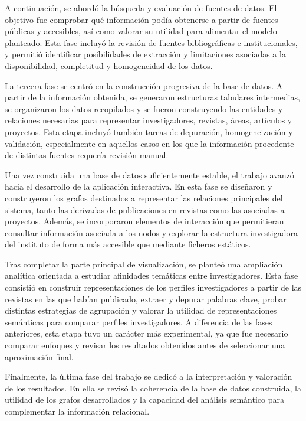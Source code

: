 \documentclass[11pt,spanish,listoffigures,listoftables]{tfgetsinf}
\begin{document}
A continuación, se abordó la búsqueda y evaluación de fuentes de datos. El objetivo fue comprobar qué información podía obtenerse a partir de fuentes públicas y accesibles, así como valorar su utilidad para alimentar el modelo planteado. Esta fase incluyó la revisión de fuentes bibliográficas e institucionales, y permitió identificar posibilidades de extracción y limitaciones asociadas a la disponibilidad, completitud y homogeneidad de los datos.

La tercera fase se centró en la construcción progresiva de la base de datos. A partir de la información obtenida, se generaron estructuras tabulares intermedias, se organizaron los datos recopilados y se fueron construyendo las entidades y relaciones necesarias para representar investigadores, revistas, áreas, artículos y proyectos. Esta etapa incluyó también tareas de depuración, homogeneización y validación, especialmente en aquellos casos en los que la información procedente de distintas fuentes requería revisión manual.

Una vez construida una base de datos suficientemente estable, el trabajo avanzó hacia el desarrollo de la aplicación interactiva. En esta fase se diseñaron y construyeron los grafos destinados a representar las relaciones principales del sistema, tanto las derivadas de publicaciones en revistas como las asociadas a proyectos. Además, se incorporaron elementos de interacción que permitieran consultar información asociada a los nodos y explorar la estructura investigadora del instituto de forma más accesible que mediante ficheros estáticos.

Tras completar la parte principal de visualización, se planteó una ampliación analítica orientada a estudiar afinidades temáticas entre investigadores. Esta fase consistió en construir representaciones de los perfiles investigadores a partir de las revistas en las que habían publicado, extraer y depurar palabras clave, probar distintas estrategias de agrupación y valorar la utilidad de representaciones semánticas para comparar perfiles investigadores. A diferencia de las fases anteriores, esta etapa tuvo un carácter más experimental, ya que fue necesario comparar enfoques y revisar los resultados obtenidos antes de seleccionar una aproximación final.

Finalmente, la última fase del trabajo se dedicó a la interpretación y valoración de los resultados. En ella se revisó la coherencia de la base de datos construida, la utilidad de los grafos desarrollados y la capacidad del análisis semántico para complementar la información relacional.
\end{document}
